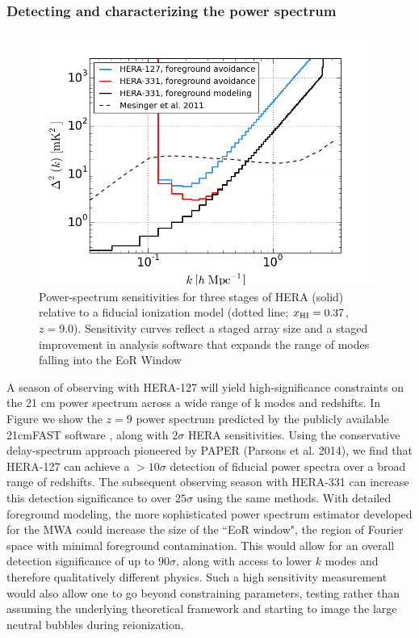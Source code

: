 \documentclass[preprint]{aastex}
\def\HI{{H{\small I }}}
\def\xHI{{x_{\rm\HI}}}
\begin{document}
\subsubsection{Detecting and characterizing the power spectrum}
\begin{figure}[t]\centering
\includegraphics[height=3.25in]{plots/Pspec/eor_pspec_2014.png}
\caption{Power-spectrum sensitivities for three stages of
HERA (solid) relative to a fiducial ionization model (dotted line; $\xHI=0.37$, $z=9.0$).  
Sensitivity curves reflect a staged array size and
a staged improvement in analysis software that expands the range
of modes falling into the EoR Window \label{fig:PspecSensitivity}}
\end{figure}

A season of observing with HERA-127 will yield high-significance constraints on the 21 cm power spectrum across a wide range of k modes and redshifts.  In Figure we show the $z=9$ power spectrum predicted by the publicly available 21cmFAST software \citep{mesinger_et_al2011}, along with $2\sigma$ HERA sensitivities.  Using the conservative delay-spectrum approach pioneered by PAPER (Parsons et al. 2014), we find that HERA-127 can achieve a $> 10\sigma$ detection of fiducial power spectra over a broad range of redshifts.  The subsequent observing season with HERA-331 can increase this detection significance to over $25\sigma$ using the same methods.  With detailed foreground modeling, the more sophisticated power spectrum estimator developed for the MWA could increase the size of the ``EoR window", the region of Fourier space with minimal foreground contamination. This would allow for an overall detection significance of up to $90\sigma$, along with access to lower $k$ modes and therefore qualitatively different physics.  Such a high 
sensitivity measurement would also allow one to go beyond constraining parameters, testing rather than assuming the underlying theoretical framework and starting to image the large neutral bubbles during reionization.
\end{document}
